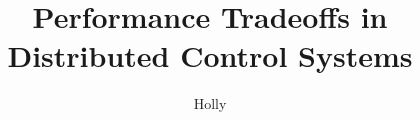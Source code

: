 \documentclass[defaultstyle,11pt]{thesis}
\title{Performance Tradeoffs in Distributed Control Systems}
\author{Holly}{Borowski}
\begin{document}




\graphicspath{{figs/}}










\appendix


%
%
%
%
\end{document}
